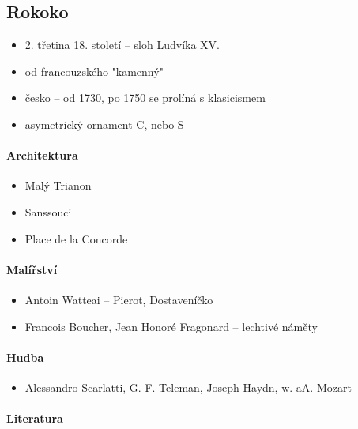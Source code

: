 \subsection{Rokoko}
\begin{itemize}
\item 2. třetina 18. století -- sloh Ludvíka XV.
\item od francouzského "kamenný"
\item česko -- od 1730, po 1750 se prolíná s klasicismem
\item asymetrický ornament C, nebo S
\end{itemize}

\paragraph{Architektura}
\begin{itemize}
\item Malý Trianon
\item Sanssouci
\item Place de la Concorde
\end{itemize}

\paragraph{Malířství}
\begin{itemize}
\item Antoin Watteai -- Pierot, Dostaveníčko
\item Francois Boucher, Jean Honoré Fragonard  -- lechtivé náměty
\end{itemize}

\paragraph{Hudba}
\begin{itemize}
\item Alessandro Scarlatti, G. F. Teleman, Joseph Haydn, w. aA. Mozart 
\end{itemize}

\paragraph{Literatura}


